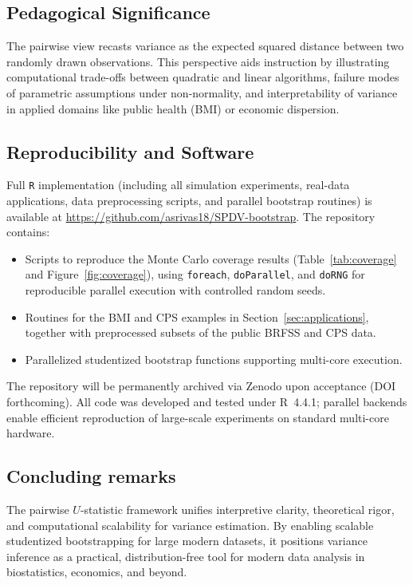 \documentclass[12pt,a4paper]{article}
\begin{document}
\subsection{Pedagogical Significance}
The pairwise view recasts variance as the expected squared distance between two randomly drawn observations. This perspective aids instruction by illustrating computational trade-offs between quadratic and linear algorithms, failure modes of parametric assumptions under non-normality, and interpretability of variance in applied domains like public health (BMI) or economic dispersion.

\subsection{Reproducibility and Software}

Full \texttt{R} implementation (including all simulation experiments, real-data applications, data preprocessing scripts, and parallel bootstrap routines) is available at \url{https://github.com/asrivas18/SPDV-bootstrap}. The repository contains:
\begin{itemize}
    \item Scripts to reproduce the Monte Carlo coverage results (Table~\ref{tab:coverage} and Figure~\ref{fig:coverage}), using \texttt{foreach}, \texttt{doParallel}, and \texttt{doRNG} for reproducible parallel execution with controlled random seeds.
    \item Routines for the BMI and CPS examples in Section~\ref{sec:applications}, together with preprocessed subsets of the public BRFSS and CPS data.
    \item Parallelized studentized bootstrap functions supporting multi-core execution.
\end{itemize}

The repository will be permanently archived via Zenodo upon acceptance (DOI forthcoming). All code was developed and tested under R~4.4.1; parallel backends enable efficient reproduction of large-scale experiments on standard multi-core hardware.

\subsection{Concluding remarks}
The pairwise $U$-statistic framework unifies interpretive clarity, theoretical rigor, and computational scalability for variance estimation. By enabling scalable studentized bootstrapping for large modern datasets, it positions variance inference as a practical, distribution-free tool for modern data analysis in biostatistics, economics, and beyond.
\end{document}
